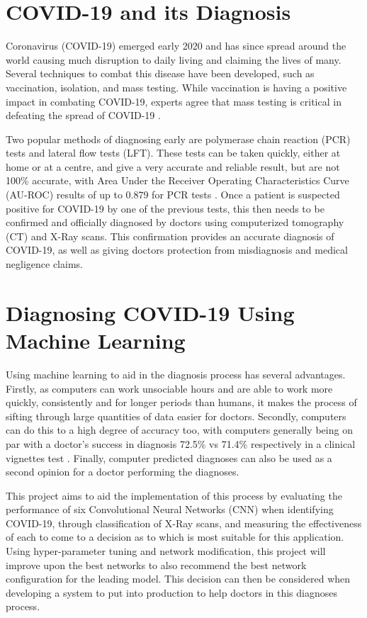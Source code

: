 \section{COVID-19 and its Diagnosis}
Coronavirus (COVID-19) emerged early 2020 and has since spread around the world causing much disruption to daily living and claiming the lives of many. Several techniques to combat this disease have been developed, such as vaccination, isolation, and mass testing. While vaccination is having a positive impact in combating COVID-19, experts agree that mass testing is critical in defeating the spread of COVID-19 \citep{rosenthal2020importance}.

Two popular methods of diagnosing early are polymerase chain reaction (PCR) tests and lateral flow tests (LFT). These tests can be taken quickly, either at home or at a centre, and give a very accurate and reliable result, but are not 100\% accurate, with Area Under the Receiver Operating Characteristics Curve (AU-ROC) results of up to 0.879 for PCR tests \citep{mardani2020laboratory}. Once a patient is suspected positive for COVID-19 by one of the previous tests, this then needs to be confirmed and officially diagnosed by doctors using computerized tomography (CT) and X-Ray scans. This confirmation provides an accurate diagnosis of COVID-19, as well as giving doctors protection from misdiagnosis and medical negligence claims.

\section{Diagnosing COVID-19 Using Machine Learning}
Using machine learning to aid in the diagnosis process has several advantages. Firstly, as computers can work unsociable hours and are able to work more quickly, consistently and for longer periods than humans, it makes the process of sifting through large quantities of data easier for doctors. Secondly, computers can do this to a high degree of accuracy too, with computers generally being on par with a doctor’s success in diagnosis 72.5\% vs 71.4\% respectively in a clinical vignettes test \citep{richens2020improving}. Finally, computer predicted diagnoses can also be used as a second opinion for a doctor performing the diagnoses. 

This project aims to aid the implementation of this process by evaluating the performance of six Convolutional Neural Networks (CNN) when identifying COVID-19, through classification of X-Ray scans, and measuring the effectiveness of each to come to a decision as to which is most suitable for this application. Using hyper-parameter tuning and network modification, this project will improve upon the best networks to also recommend the best network configuration for the leading model. This decision can then be considered when developing a system to put into production to help doctors in this diagnoses process.
